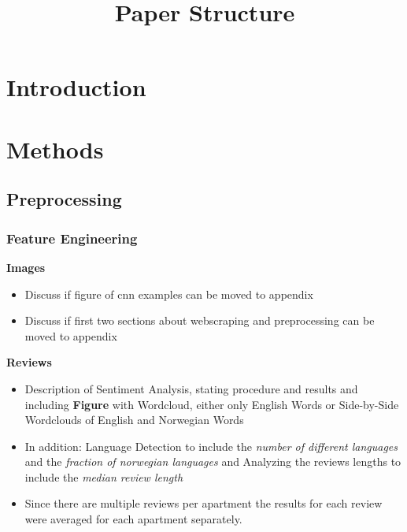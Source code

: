 \documentclass[12pt, letterpaper]{article}
\title{Paper Structure}
\author{}
\date{}
\begin{document}
\maketitle
\tableofcontents
\setcounter{tocdepth}{3}


\section{Introduction} %


\section{Methods} %


\subsection{Preprocessing} %

\subsubsection{Feature Engineering} %

\textbf{Images} %

\begin{itemize}
    \item Discuss if figure of cnn examples can be moved to appendix
    \item Discuss if first two sections about webscraping and preprocessing can be moved to appendix
\end{itemize}

\textbf{Reviews} %
\begin{itemize}
    \item Description of Sentiment Analysis, stating procedure and results and including \textbf{Figure} with Wordcloud, either only English Words or Side-by-Side Wordclouds of English and Norwegian Words
    \item In addition: Language Detection to include the \emph{number of different languages} and the \emph{fraction of norwegian languages} and Analyzing the reviews lengths to include the \emph{median review length}
    \item Since there are multiple reviews per apartment the results for each review were averaged for each apartment separately.
\end{itemize}
\end{document}
